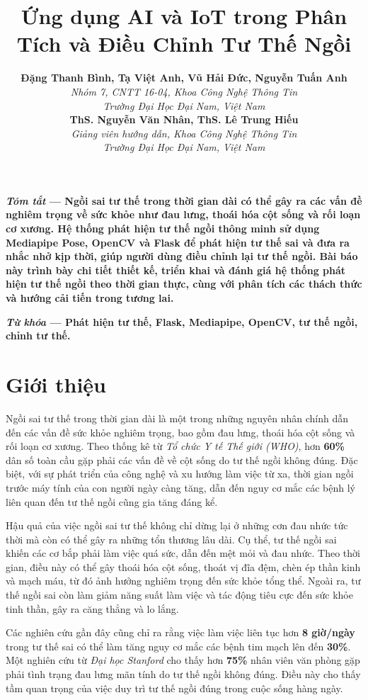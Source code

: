 \documentclass[conference]{IEEEtran}
\title{Ứng dụng AI và IoT trong Phân Tích và Điều Chỉnh Tư Thế Ngồi}
\author{
    \textbf{Đặng Thanh Bình, Tạ Việt Anh, Vũ Hải Đức, Nguyễn Tuấn Anh} \\
    \textit{Nhóm 7, CNTT 16-04, Khoa Công Nghệ Thông Tin} \\
    \textit{Trường Đại Học Đại Nam, Việt Nam} \\
    \textbf{ThS. Nguyễn Văn Nhân, ThS. Lê Trung Hiếu} \\
    \textit{Giảng viên hướng dẫn, Khoa Công Nghệ Thông Tin} \\
    \textit{Trường Đại Học Đại Nam, Việt Nam}
}
\begin{document}
\maketitle
\IEEEpeerreviewmaketitle

\noindent\textbf{\textit{Tóm tắt} --- Ngồi sai tư thế trong thời gian dài có thể gây ra các vấn đề nghiêm trọng về sức khỏe như đau lưng, thoái hóa cột sống và rối loạn cơ xương. Hệ thống phát hiện tư thế ngồi thông minh sử dụng Mediapipe Pose, OpenCV và Flask để phát hiện tư thế sai và đưa ra nhắc nhở kịp thời, giúp người dùng điều chỉnh lại tư thế ngồi. Bài báo này trình bày chi tiết thiết kế, triển khai và đánh giá hệ thống phát hiện tư thế ngồi theo thời gian thực, cùng với phân tích các thách thức và hướng cải tiến trong tương lai.}

\vspace{2mm} %

\noindent\textbf{\textit{Từ khóa} --- Phát hiện tư thế, Flask, Mediapipe, OpenCV, tư thế ngồi, chỉnh tư thế.}

\section{Giới thiệu}
Ngồi sai tư thế trong thời gian dài là một trong những nguyên nhân chính dẫn đến các vấn đề sức khỏe nghiêm trọng, bao gồm đau lưng, thoái hóa cột sống và rối loạn cơ xương. Theo thống kê từ \textit{Tổ chức Y tế Thế giới (WHO)}, hơn \textbf{60\%} dân số toàn cầu gặp phải các vấn đề về cột sống do tư thế ngồi không đúng. Đặc biệt, với sự phát triển của công nghệ và xu hướng làm việc từ xa, thời gian ngồi trước máy tính của con người ngày càng tăng, dẫn đến nguy cơ mắc các bệnh lý liên quan đến tư thế ngồi cũng gia tăng đáng kể.

Hậu quả của việc ngồi sai tư thế không chỉ dừng lại ở những cơn đau nhức tức thời mà còn có thể gây ra những tổn thương lâu dài. Cụ thể, tư thế ngồi sai khiến các cơ bắp phải làm việc quá sức, dẫn đến mệt mỏi và đau nhức. Theo thời gian, điều này có thể gây thoái hóa cột sống, thoát vị đĩa đệm, chèn ép thần kinh và mạch máu, từ đó ảnh hưởng nghiêm trọng đến sức khỏe tổng thể. Ngoài ra, tư thế ngồi sai còn làm giảm năng suất làm việc và tác động tiêu cực đến sức khỏe tinh thần, gây ra căng thẳng và lo lắng.

Các nghiên cứu gần đây cũng chỉ ra rằng việc làm việc liên tục hơn \textbf{8 giờ/ngày} trong tư thế sai có thể làm tăng nguy cơ mắc các bệnh tim mạch lên đến \textbf{30\%}. Một nghiên cứu từ \textit{Đại học Stanford} cho thấy hơn \textbf{75\%} nhân viên văn phòng gặp phải tình trạng đau lưng mãn tính do tư thế ngồi không đúng. Điều này cho thấy tầm quan trọng của việc duy trì tư thế ngồi đúng trong cuộc sống hàng ngày.
\end{document}
